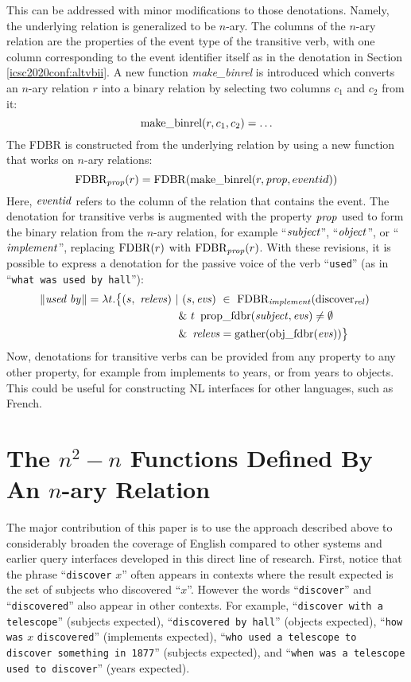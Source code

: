 \documentclass[../main.tex]{subfiles}
\begin{document}
\begin{refsection}
This can be addressed with minor modifications to those denotations. Namely, the underlying relation is generalized to be $n$-ary. The columns of the $n$-ary relation are the properties of the event type of the transitive verb, with one column corresponding to the event identifier itself as in the denotation in Section \ref{icsc2020conf:altvbii}. A new function {\em make\_binrel} is introduced which converts an $n$-ary relation $r$ into a binary relation by selecting two columns $c_1$ and $c_2$ from it:
\[
\text{make\_binrel}({r}, {c_1}, {c_2}) = \ldots
\]
The FDBR is constructed from the underlying relation by using a new function that works on $n$-ary relations:
\[\text{FDBR}_{\operatorname{\mathit{prop}}}(r) = \operatorname{FDBR}({\text{make\_binrel}({r}, {\operatorname{\mathit{prop}}}, {eventid})})\]
Here, $\operatorname{\mathit{eventid}}$ refers to the column of the relation that contains the event.
The denotation for transitive verbs is augmented with the property $\operatorname{\mathit{prop}}$ used to form the binary relation from the $n$-ary relation, for example ``$\operatorname{\mathit{subject}}$'', ``$\operatorname{\mathit{object}}$'', or ``$\operatorname{\mathit{implement}}$'', replacing $\operatorname{FDBR}({r})$ with $\text{FDBR}_{\operatorname{\mathit{prop}}}(r)$.  With these revisions, it is possible to express a denotation for the passive voice of the verb ``\texttt{used}'' (as in ``\texttt{what was used by hall}''):
\begin{equation*}
	\begin{split}
		\meaningof{used by} = \lambda t.\big\{ (s,\ \opit{relevs})\ |&\ (s, \evs)\ \in\ \dmathrm{FDBR}_{\opit{implement}}(\relation{discover})\  \\
		& \&\ t\ \propfdbr{\opit{subject}}{\evs} \neq \emptyset \\
		& \&\ \opit{relevs} = \gatherevs{\objfdbr{\evs}} \big\}
	\end{split}
\end{equation*}
Now, denotations for transitive verbs can be provided from any property to any other property, for example from implements to years, or from years to objects. This could be useful for constructing NL interfaces for other languages, such as French.

\section{The $n^2-n$ Functions Defined By An $n$-ary Relation}

The major contribution of this paper is to use the approach described above to considerably broaden the coverage of English compared to other systems and earlier \cite{graphmqslide,peelar2016accommodating} query interfaces developed in this direct line of research.
First, notice that the phrase ``\texttt{discover} $x$'' often appears in contexts where the result expected is
the set of subjects who discovered ``$x$''. However the words ``\texttt{discover}'' and ``\texttt{discovered}''
also appear in other contexts. For example, ``\texttt{discover with a telescope}'' (subjects expected), ``\texttt{discovered by
hall}'' (objects expected), ``\texttt{how was} $x$ \texttt{discovered}''  (implements expected), ``\texttt{who used a telescope
to discover something in 1877}'' (subjects expected), and ``\texttt{when was a telescope used to discover}'' (years
expected).


\end{refsection}
\end{document}
